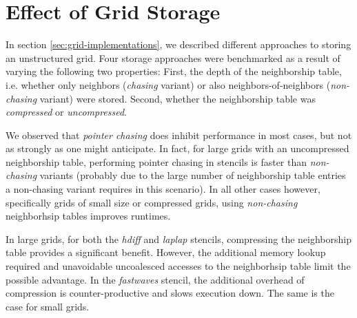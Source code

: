 \section{Effect of Grid Storage} \label{sec:res-storage}

In section \ref{sec:grid-implementations}, we described different approaches to storing an unstructured grid. Four storage approaches were benchmarked as a result of varying the following two properties: First, the depth of the neighborship table, i.e. whether only neighbors (\emph{chasing} variant) or also neighbors-of-neighbors (\emph{non-chasing} variant) were stored. Second, whether the neighborship table was \emph{compressed} or \emph{uncompressed}.

We observed that \emph{pointer chasing} does inhibit performance in most cases, but not as strongly as one might anticipate. In fact, for large grids with an uncompressed neighborship table, performing pointer chasing in stencils is faster than \emph{non-chasing} variants (probably due to the large number of neighborship table entries a non-chasing variant requires in this scenario). In all other cases however, specifically grids of small size or compressed grids, using \emph{non-chasing} neighborhsip tables improves runtimes.

In large grids, for both the \emph{hdiff} and \emph{laplap} stencils, compressing the neighborship table provides a significant benefit. However, the additional memory lookup required and unavoidable uncoalesced accesses to the neighborhsip table limit the possible advantage. In the \emph{fastwaves} stencil, the additional overhead of compression is counter-productive and slows execution down. The same is the case for small grids.

